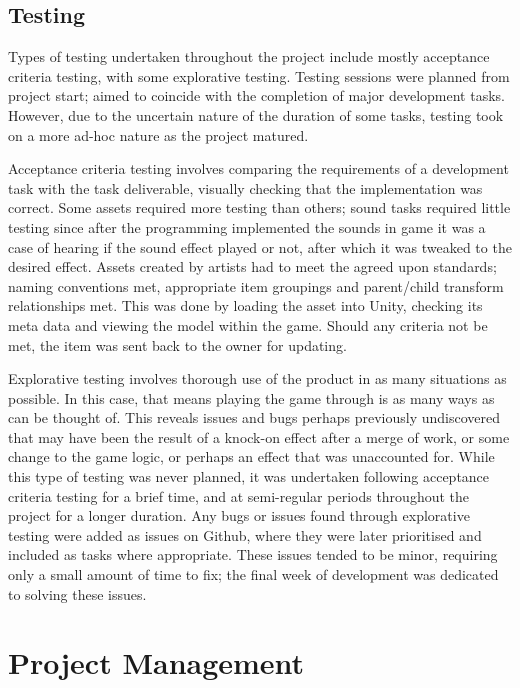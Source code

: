\documentclass[12pt]{article}
\begin{document}
\subsection{Testing}
Types of testing undertaken throughout the project include mostly acceptance criteria testing, with some explorative testing. Testing sessions were planned from project start; aimed to coincide with the completion of major development tasks. However, due to the uncertain nature of the duration of some tasks, testing took on a more ad-hoc nature as the project matured. 

Acceptance criteria testing involves comparing the requirements of a development task with the task deliverable, visually checking that the implementation was correct. Some assets required more testing than others; sound tasks required little testing since after the programming implemented the sounds in game it was a case of hearing if the sound effect played or not, after which it was tweaked to the desired effect. Assets created by artists had to meet the agreed upon standards; naming conventions met, appropriate item groupings and parent/child transform relationships met. This was done by loading the asset into Unity, checking its meta data and viewing the model within the game. Should any criteria not be met, the item was sent back to the owner for updating. 

Explorative testing involves thorough use of the product in as many situations as possible. In this case, that means playing the game through is as many ways as can be thought of. This reveals issues and bugs perhaps previously undiscovered that may have been the result of a knock-on effect after a merge of work, or some change to the game logic, or perhaps an effect that was unaccounted for. While this type of testing was never planned, it was undertaken following acceptance criteria testing for a brief time, and at semi-regular periods throughout the project for a longer duration. Any bugs or issues found through explorative testing were added as issues on Github, where they were later prioritised and included as tasks where appropriate. These issues tended to be minor, requiring only a small amount of time to fix; the final week of development was dedicated to solving these issues. 


\section{Project Management}
\end{document}
